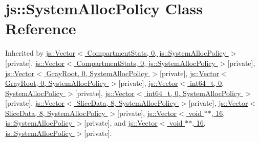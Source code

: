 \hypertarget{classjs_1_1_system_alloc_policy}{\section{js\-:\-:System\-Alloc\-Policy Class Reference}
\label{classjs_1_1_system_alloc_policy}
}


Inherited by \hyperlink{classjs_1_1_vector}{js\-::\-Vector$<$ Compartment\-Stats, 0, js\-::\-System\-Alloc\-Policy $>$}{\ttfamily  \mbox{[}private\mbox{]}}, \hyperlink{classjs_1_1_vector}{js\-::\-Vector$<$ Compartment\-Stats, 0, js\-::\-System\-Alloc\-Policy $>$}{\ttfamily  \mbox{[}private\mbox{]}}, \hyperlink{classjs_1_1_vector}{js\-::\-Vector$<$ Gray\-Root, 0, System\-Alloc\-Policy $>$}{\ttfamily  \mbox{[}private\mbox{]}}, \hyperlink{classjs_1_1_vector}{js\-::\-Vector$<$ Gray\-Root, 0, System\-Alloc\-Policy $>$}{\ttfamily  \mbox{[}private\mbox{]}}, \hyperlink{classjs_1_1_vector}{js\-::\-Vector$<$ int64\-\_\-t, 0, System\-Alloc\-Policy $>$}{\ttfamily  \mbox{[}private\mbox{]}}, \hyperlink{classjs_1_1_vector}{js\-::\-Vector$<$ int64\-\_\-t, 0, System\-Alloc\-Policy $>$}{\ttfamily  \mbox{[}private\mbox{]}}, \hyperlink{classjs_1_1_vector}{js\-::\-Vector$<$ Slice\-Data, 8, System\-Alloc\-Policy $>$}{\ttfamily  \mbox{[}private\mbox{]}}, \hyperlink{classjs_1_1_vector}{js\-::\-Vector$<$ Slice\-Data, 8, System\-Alloc\-Policy $>$}{\ttfamily  \mbox{[}private\mbox{]}}, \hyperlink{classjs_1_1_vector}{js\-::\-Vector$<$ void $\ast$$\ast$, 16, js\-::\-System\-Alloc\-Policy $>$}{\ttfamily  \mbox{[}private\mbox{]}}, and \hyperlink{classjs_1_1_vector}{js\-::\-Vector$<$ void $\ast$$\ast$, 16, js\-::\-System\-Alloc\-Policy $>$}{\ttfamily  \mbox{[}private\mbox{]}}.

